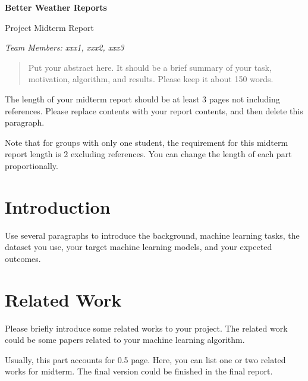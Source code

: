 \documentclass[11pt]{article}
\begin{document}
\begin{center}
{\Large \textbf{Better Weather Reports}

\vspace{10pt}

Project Midterm Report}

\vspace{10pt}

\textit{Team Members: xxx1, xxx2, xxx3}
\end{center}




\begin{abstract}
  Put your abstract here. It should be a brief summary of your
  task, motivation, algorithm, and results. Please keep it about
  150 words.
\end{abstract}

{\color{red} The length of your midterm report should be at least
3 pages not including references. Please replace contents with
your report contents, and then delete this paragraph.

Note that for groups with only one student, the requirement for
this midterm report length is 2 excluding references. You can
change the length of each part proportionally.}

\section{Introduction}

Use several paragraphs to introduce the background, machine
learning tasks, the dataset you use, your target machine learning
models, and your expected outcomes.

\section{Related Work}

Please briefly introduce some related works to your project. The
related work could be some papers related to your machine
learning algorithm.

Usually, this part accounts for 0.5 page. Here, you can list one
or two related works for midterm. The final version could be
finished in the final report.
\end{document}

